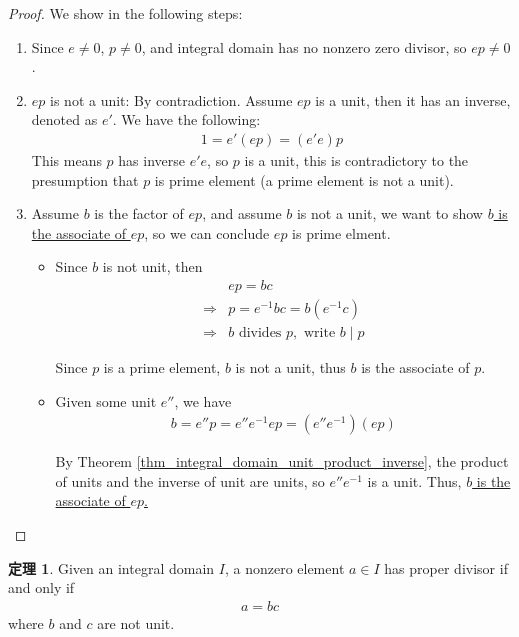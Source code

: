 \documentclass[utf8]{ctexbook}
\theoremstyle{definition}
\newtheorem{prototheorem}{定理}[section]
\newenvironment{theorem}
   {\colorlet{shadecolor}{pink!30}\begin{shaded}\begin{prototheorem}}
   {\end{prototheorem}\end{shaded}}
\begin{document}
\begin{proof}
We show in the following steps:
\begin{enumerate}
\item{Since $e \neq 0$, $p \neq 0$, and integral domain has no nonzero zero divisor, so $e p \neq 0$.}
\item{$e p $ is not a unit: By contradiction. Assume $e p$ is a unit, then it has an inverse, denoted as $e'$. We have the following:
\begin{align*}
1 = e' (e p) = (e' e ) p
\end{align*}
This means $p$ has inverse $e' e$, so $p$ is a unit, this is contradictory to the presumption that $p$ is prime element (a prime element is not a unit).}
\item{Assume $b$ is the factor of $e p$, and assume $b$ is not a unit, we want to show \underline{$b$ is the associate of $e p$}, so we can conclude $e p$ is prime elment.}
\begin{itemize}
\item{Since $b$ is not unit, then
\begin{align*}
& e p = b c  \\
\Longrightarrow & p = e^{-1} b c = b (e^{-1} c ) \\
\Longrightarrow & b \mbox{ divides } p, \mbox{ write } b \mid p
\end{align*}

Since $p$ is a prime element, $b$ is not a unit, thus $b$ is the associate of $p$.} 
\item{Given some unit $e''$, we have
\begin{align*}
b = e'' p = e'' e^{-1} e p = (e'' e^{-1} ) (e p)
\end{align*}

By Theorem \ref{thm_integral_domain_unit_product_inverse}, the product of units and the inverse of unit are units, so $e'' e^{-1} $ is a unit. Thus, \underline{$b$ is the associate of $e p$.}
}
\end{itemize}

\end{enumerate}
\end{proof}

\begin{theorem}\label{thm_integral_domain_proper_divisor_redef}
Given an integral domain $I$, a nonzero element $a \in I$ has proper divisor if and only if
\begin{align*}
a = b c
\end{align*}
where $b$ and $c$ are not unit.
\end{theorem}
\end{document}
